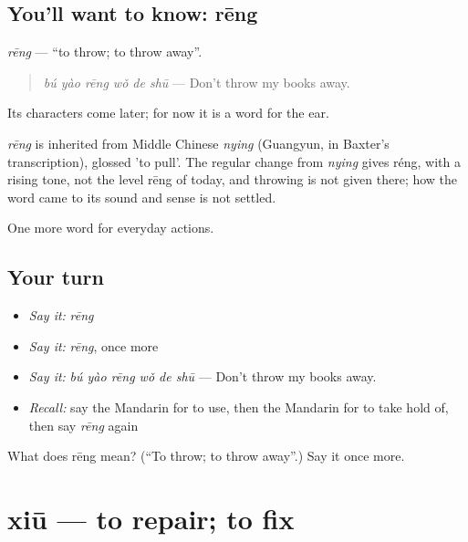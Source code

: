 \subsection*{You'll want to know: rēng}
\emph{rēng} — \textquotedblleft{}to throw; to throw away\textquotedblright{}.

\begin{quote}
\emph{bú yào rēng wǒ de shū} — Don't throw my books away.
\end{quote}

Its characters come later; for now it is a word for the ear.

\begin{cousinweb}
\emph{rēng} is inherited from Middle Chinese \emph{nying} (Guangyun, in Baxter's transcription), glossed 'to pull'. The regular change from \emph{nying} gives réng, with a rising tone, not the level rēng of today, and throwing is not given there; how the word came to its sound and sense is not settled.
\end{cousinweb}

\begin{grammarlens}[title={What you've built}]
One more word for everyday actions.
\end{grammarlens}

\subsection*{Your turn}
\begin{itemize}
\raggedright
  \item \emph{Say it:} \emph{rēng}
  \item \emph{Say it:} \emph{rēng}, once more
  \item \emph{Say it:} \emph{bú yào rēng wǒ de shū} — Don't throw my books away.
  \item \emph{Recall:} say the Mandarin for to use, then the Mandarin for to take hold of, then say \emph{rēng} again
\end{itemize}

\begin{tcolorbox}[breakable,colback=teal!4,colframe=teal!35!black,title={Before you move on}]
What does rēng mean? (\textquotedblleft{}To throw; to throw away\textquotedblright{}.) Say it once more.
\end{tcolorbox}
\section[xiū]{xiū — to repair; to fix}

